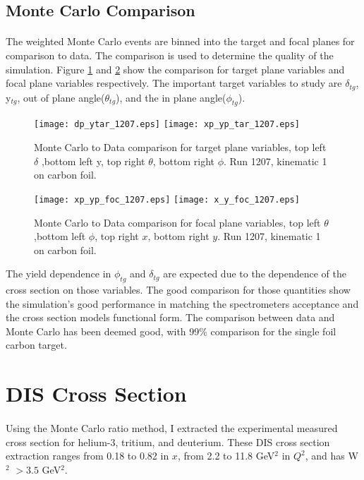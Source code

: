 \subsection{Monte Carlo Comparison}
\paragraph{}The weighted Monte Carlo events are binned into the target and focal planes for comparison to data. The comparison is used to determine the quality of the simulation. Figure \ref{tcomp} and \ref{fcomp} show the comparison for target plane variables and focal plane variables respectively. The important target variables to study are $\delta_{tg}$, y$_{tg}$, out of plane angle($\theta_{tg}$), and the in plane angle($\phi_{tg}$). 
\begin{figure}[h]
	\caption{Monte Carlo to Data comparison for target plane variables, top left $\delta$ ,bottom left y, top right $\theta$, bottom right $\phi$. Run 1207, kinematic 1 on carbon foil.\label{tcomp}}
	{\centering
	\hspace{-50pt}
	\texttt{[image: dp\_ytar\_1207.eps]}
	\texttt{[image: xp\_yp\_tar\_1207.eps]}
}
\end{figure}
\begin{figure}[H]
	\caption{Monte Carlo to Data comparison for focal plane variables, top left $\theta$ ,bottom left $\phi$, top right $x$, bottom right $y$. Run 1207, kinematic 1 on carbon foil. \label{fcomp} }
	{\centering
	\hspace{-50pt}
	\texttt{[image: xp\_yp\_foc\_1207.eps]}
	\texttt{[image: x\_y\_foc\_1207.eps]}}
\end{figure}
The yield dependence in $\phi_{tg}$ and $\delta_{tg}$ are expected due to the dependence of the cross section on those variables. The good comparison for those quantities show the simulation's good performance in matching the spectrometers acceptance and the cross section models functional form. The comparison between data and Monte Carlo has been deemed good, with 99\% comparison for the single foil carbon target. 

\section{DIS Cross Section}
\paragraph{}Using the Monte Carlo ratio method, I extracted the experimental measured cross section for helium-3, tritium, and deuterium. These DIS cross section extraction ranges from 0.18 to 0.82 in $x$, from 2.2 to 11.8 GeV$^2$ in $Q^2$, and has W$^2$ $>3.5$ GeV$^2$. 

